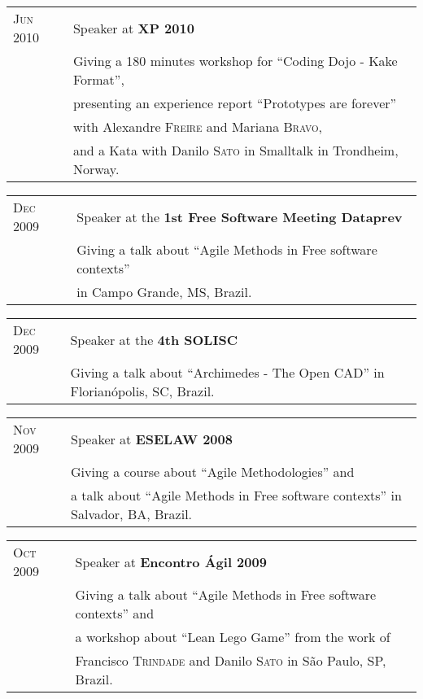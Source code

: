 \documentclass[letter,10pt]{article}
\begin{document}
\begin{tabular}{p{2.5cm}l}
  \textsc{Jun 2010} & Speaker at \textbf{XP 2010}\\
  &Giving a 180 minutes workshop for ``Coding Dojo - Kake Format'',\\
  & presenting an experience report ``Prototypes are forever''\\
  & with Alexandre \textsc{Freire} and Mariana \textsc{Bravo},\\
  & and a Kata with Danilo \textsc{Sato} in Smalltalk in Trondheim, Norway.\\
\end{tabular}

\begin{tabular}{p{2.5cm}l}
  \textsc{Dec 2009} & Speaker at the \textbf{1st Free Software Meeting Dataprev}\\
  &Giving a talk about ``Agile Methods in Free software contexts''\\
  &in Campo Grande, MS, Brazil.\\
\end{tabular}

\begin{tabular}{p{2.5cm}l}
  \textsc{Dec 2009} & Speaker at the \textbf{4th SOLISC}\\
  &Giving a talk about ``Archimedes - The Open CAD'' in Florianópolis, SC, Brazil.\\
\end{tabular}

\begin{tabular}{p{2.5cm}l}
  \textsc{Nov 2009} & Speaker at \textbf{ESELAW 2008}\\
  &Giving a course about ``Agile Methodologies'' and\\
  &a talk about ``Agile Methods in Free software contexts'' in Salvador, BA, Brazil.\\
\end{tabular}

\begin{tabular}{p{2.5cm}l}
  \textsc{Oct 2009} & Speaker at \textbf{Encontro Ágil 2009}\\
  &Giving a talk about ``Agile Methods in Free software contexts'' and\\
  &a workshop about ``Lean Lego Game'' from the work of\\
  &Francisco \textsc{Trindade} and Danilo \textsc{Sato} in São Paulo, SP, Brazil.\\
\end{tabular}
\end{document}
